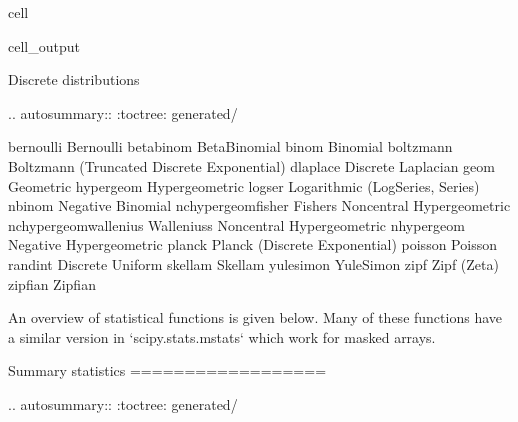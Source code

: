 \documentclass[letterpaper,10pt,english]{jupyterBook}
\begin{document}
\begin{sphinxuseclass}{cell}
\begin{sphinxVerbatimOutput}
\begin{sphinxuseclass}{cell_output}
\begin{sphinxVerbatim}[commandchars=\\\{\}]
Discrete distributions
\PYGZhy{}\PYGZhy{}\PYGZhy{}\PYGZhy{}\PYGZhy{}\PYGZhy{}\PYGZhy{}\PYGZhy{}\PYGZhy{}\PYGZhy{}\PYGZhy{}\PYGZhy{}\PYGZhy{}\PYGZhy{}\PYGZhy{}\PYGZhy{}\PYGZhy{}\PYGZhy{}\PYGZhy{}\PYGZhy{}\PYGZhy{}\PYGZhy{}

.. autosummary::
   :toctree: generated/

   bernoulli                \PYGZhy{}\PYGZhy{} Bernoulli
   betabinom                \PYGZhy{}\PYGZhy{} Beta\PYGZhy{}Binomial
   binom                    \PYGZhy{}\PYGZhy{} Binomial
   boltzmann                \PYGZhy{}\PYGZhy{} Boltzmann (Truncated Discrete Exponential)
   dlaplace                 \PYGZhy{}\PYGZhy{} Discrete Laplacian
   geom                     \PYGZhy{}\PYGZhy{} Geometric
   hypergeom                \PYGZhy{}\PYGZhy{} Hypergeometric
   logser                   \PYGZhy{}\PYGZhy{} Logarithmic (Log\PYGZhy{}Series, Series)
   nbinom                   \PYGZhy{}\PYGZhy{} Negative Binomial
   nchypergeom\PYGZus{}fisher       \PYGZhy{}\PYGZhy{} Fisher\PYGZsq{}s Noncentral Hypergeometric
   nchypergeom\PYGZus{}wallenius    \PYGZhy{}\PYGZhy{} Wallenius\PYGZsq{}s Noncentral Hypergeometric
   nhypergeom               \PYGZhy{}\PYGZhy{} Negative Hypergeometric
   planck                   \PYGZhy{}\PYGZhy{} Planck (Discrete Exponential)
   poisson                  \PYGZhy{}\PYGZhy{} Poisson
   randint                  \PYGZhy{}\PYGZhy{} Discrete Uniform
   skellam                  \PYGZhy{}\PYGZhy{} Skellam
   yulesimon                \PYGZhy{}\PYGZhy{} Yule\PYGZhy{}Simon
   zipf                     \PYGZhy{}\PYGZhy{} Zipf (Zeta)
   zipfian                  \PYGZhy{}\PYGZhy{} Zipfian

An overview of statistical functions is given below.  Many of these functions
have a similar version in `scipy.stats.mstats` which work for masked arrays.

Summary statistics
==================

.. autosummary::
   :toctree: generated/


\end{sphinxVerbatim}
\end{sphinxuseclass}
\end{sphinxVerbatimOutput}
\end{sphinxuseclass}
\end{document}
